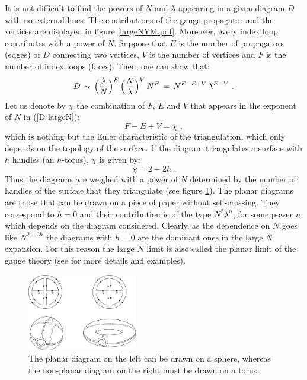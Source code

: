 \documentclass[12pt,notitlepage]{article}
\newcommand{\beq}{\begin{equation}}
\newcommand{\eeq}{\end{equation}}
\begin{document}
It is not difficult to find the powers of $N$ and $\lambda$ appearing in a given diagram $D$ with no external lines. The contributions of the gauge propagator and the vertices are displayed in figure \ref{largeNYM.pdf}.  Moreover, every index loop contributes with a power of $N$.  Suppose that $E$ is the number of propagators (edges) of $D$ connecting two vertices,  $V$  is the number of vertices  and $F$  is the number of index loops (faces). Then, one can show that:
\beq
D\,\sim \,\Big({\lambda\over N}\Big)^{E}\,\Big({N\over \lambda}\Big)^{V}\,N^{F}\,=\,
N^{F-E+V}\,\lambda^{E-V}\,\,.
\label{D-largeN}
\eeq
Let us denote by $\chi$ the combination of $F$, $E$ and $V$ that appears in the exponent of $N$ in (\ref{D-largeN}):
\beq
F-E+V=\chi\,\,,
\eeq
which is nothing but the Euler characteristic of the triangulation, which only depends on the topology of the surface. If the diagram triangulates a surface with $h$ handles (an $h$-torus), $\chi$ is given by:
\beq
\chi=2-2h\,\,.
\eeq
Thus the diagrams are weighed  with a power of $N$ determined by the number of handles of the surface that they triangulate (see figure \ref{planar_and_nonplanar}). The planar diagrams are those that can be drawn on a piece of paper without self-crossing. They correspond to $h=0$ and their contribution is of the type $N^2\lambda^n$, for some power $n$ which depends on the diagram considered. Clearly, as the dependence on $N$ goes like $N^{2-2h}$ the diagrams with $h=0$ are the dominant ones in the large $N$ expansion. For this reason the large $N$ limit is also called the planar limit of the gauge theory (see \cite{Manohar:1998xv} for more details and examples).


\begin{figure}[ht]
\center
\includegraphics[width=0.43\textwidth]{genus.pdf}
\caption{The planar diagram  on the left can be drawn on a sphere, whereas the non-planar diagram on the right must be drawn on a torus.} 
\label{planar_and_nonplanar}
\end{figure}
\end{document}
